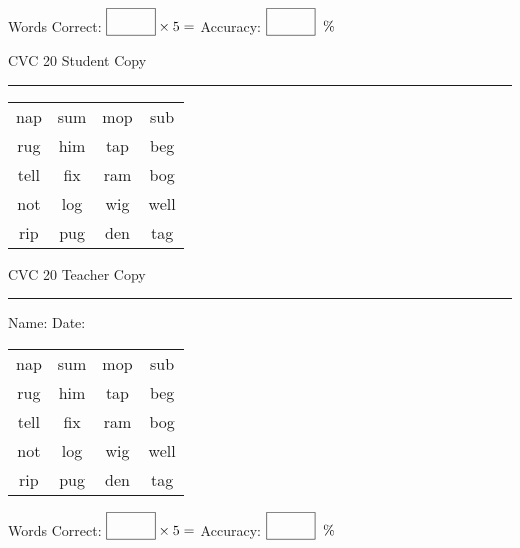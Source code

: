 \documentclass{memoir}
\begin{document}
\normalsize

Words Correct: $\fbox{\phantom{\huge 100}} \times 5 = $ Accuracy: $\fbox{\phantom{\huge 100}}\;\; \%$ 

\vfill

\newpage



\footnotesize \noindent
CVC 20 \hfill Student Copy
\smallskip
\hrule

\huge

\setlength{\tabcolsep}{14pt}
\def\arraystretch{2}

{\selectfont


\begin{vplace}[0.5]
\begin{center}
\begin{tabular}{cccc}
nap & sum & mop & sub \\
rug & him & tap & beg \\
tell & fix & ram & bog \\
not & log & wig & well \\
rip & pug & den & tag \\
\end{tabular}
\end{center}
\end{vplace}

}

\newpage

\footnotesize \noindent
CVC 20 \hfill Teacher Copy
\smallskip
\hrule

\normalsize

\vfill

\noindent
Name: \underline{\hspace{1.75in}} \hfill Date: \underline{\hspace{1in}}

\huge

{\selectfont


\begin{vplace}[0.5]
\begin{center}
\begin{tabular}{cccc}
nap & sum & mop & sub \\
rug & him & tap & beg \\
tell & fix & ram & bog \\
not & log & wig & well \\
rip & pug & den & tag \\
\end{tabular}
\end{center}
\end{vplace}



}

\normalsize

Words Correct: $\fbox{\phantom{\huge 100}} \times 5 = $ Accuracy: $\fbox{\phantom{\huge 100}}\;\; \%$ 

\vfill

\end{document}
